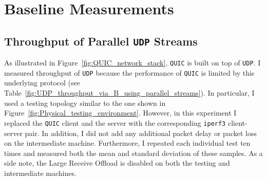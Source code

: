 \documentclass[12pt,a4paper,twoside,openright]{report}
\begin{document}
\section{Baseline Measurements}


\subsection{Throughput of Parallel \texttt{UDP} Streams} \label{section_Throughput_of_Parallel_UDP_Streams}

As illustrated in Figure~\ref{fig:QUIC_network_stack}, \texttt{QUIC} is built on top of \texttt{UDP}.
I measured throughput of \texttt{UDP} because the performance of \texttt{QUIC} is limited by this underlying protocol (see Table~\ref{fig:UDP_throughput_via_B_using_parallel_streams}).
In particular, I used a testing topology similar to the one shown in  Figure~\ref{fig:Physical_testing_environment}.
However, in this experiment I replaced the \texttt{QUIC} client and the server with the corresponding \texttt{iperf3} client-server pair.
In addition, I did not add any additional packet delay or packet loss on the intermediate machine.
Furthermore, I repeated each individual test ten times and measured both the mean and standard deviation of these samples.
As a side note, the Large Receive Offload is disabled on both the testing and intermediate machines.
\end{document}
